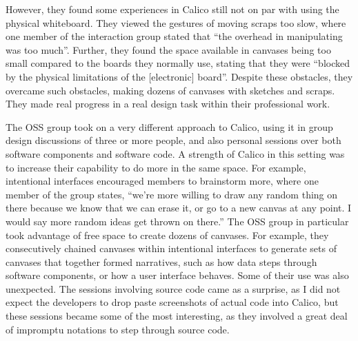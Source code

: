 \documentclass[12pt,fleqn]{ucithesis}
\begin{document}
However, they found some experiences in Calico still not on par with using the physical whiteboard. They viewed the gestures of moving scraps too slow, where one member of the interaction group stated that ``the overhead in manipulating was too much''. Further, they found the space available in canvases being too small compared to the boards they normally use, stating that they were ``blocked by the physical limitations of the [electronic] board''. Despite these obstacles, they overcame such obstacles, making dozens of canvases with sketches and scraps. They made real progress in a real design task within their professional work.

The OSS group took on a very different approach to Calico, using it in group design discussions of three or more people, and also personal sessions over both software components and software code. A strength of Calico in this setting was to increase their capability to do more in the same space. For example, intentional interfaces encouraged members to brainstorm more, where one member of the group states, ``we're more willing to draw any random thing on there because we know that we can erase it, or go to a new canvas at any point. I would say more random ideas get thrown on there.'' The OSS group in particular took advantage of free space to create dozens of canvases. For example, they consecutively chained canvases within intentional interfaces to generate sets of canvases that together formed narratives, such as how data steps through software components, or how a user interface behaves. Some of their use was also unexpected. The sessions involving source code came as a surprise, as I did not expect the developers to drop paste screenshots of actual code into Calico, but these sessions became some of the most interesting, as they involved a great deal of impromptu notations to step through source code.

\end{document}
